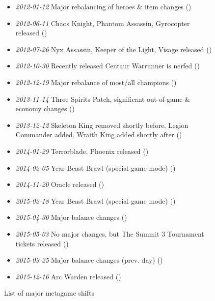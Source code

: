 \begin{figure}[p]
    \centering
    \caption{List of major metagame shifts}
    \label{fig:patches-list}
    \begin{mdframed}[linewidth=2pt]
        \begin{itemize}
            \item \emph{2012-01-12} Major rebalancing of heroes \& item changes ()
            \item \emph{2012-06-11} Chaos Knight, Phantom Assassin, Gyrocopter released ()
            \item \emph{2012-07-26} Nyx Assassin, Keeper of the Light, Visage released ()
            \item \emph{2012-10-30} Recently released Centaur Warrunner is nerfed ()
            \item \emph{2012-12-19} Major rebalance of most/all champions ()
            \item \emph{2013-11-14} Three Spirits Patch, significant out-of-game \& economy changes ()
            \item \emph{2013-12-12} Skeleton King removed shortly before, Legion Commander added, Wraith King added shortly after ()
            \item \emph{2014-01-29} Terrorblade, Phoenix released ()
            \item \emph{2014-02-05} Year Beast Brawl (special game mode) ()
            \item \emph{2014-11-20} Oracle released ()
            \item \emph{2015-02-18} Year Beast Brawl (special game mode) ()
            \item \emph{2015-04-30} Major balance changes ()
            \item \emph{2015-05-03} No major changes, but The Summit 3 Tournament tickets released ()
            \item \emph{2015-09-25} Major balance changes (prev. day) ()
            \item \emph{2015-12-16} Arc Warden released ()
        \end{itemize}
    \end{mdframed}
\end{figure}

